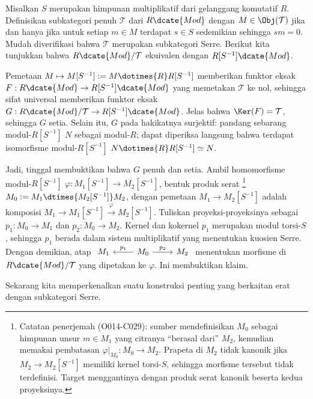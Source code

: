 \begin{contoh}
Misalkan $S$ merupakan himpunan multiplikatif dari gelanggang komutatif
$R$. Definisikan subkategori penuh $\mathcal{T}$ dari $R\dcate{Mod}$ dengan
$M\in\Obj(\mathcal{T})$ jika dan hanya jika untuk setiap $m\in M$ terdapat
$s\in S$ sedemikian sehingga $sm=0$. Mudah diverifikasi bahwa $\mathcal{T}$
merupakan subkategori Serre. Berikut kita tunjukkan bahwa
$R\dcate{Mod}/\mathcal{T}$ ekuivalen dengan $R[S^{-1}]\dcate{Mod}$.

Pemetaan $M\mapsto M[S^{-1}]:=M\dotimes{R}R[S^{-1}]$ memberikan funktor
eksak $F:R\dcate{Mod}\to R[S^{-1}]\dcate{Mod}$ yang memetakan
$\mathcal{T}$ ke nol, sehingga sifat universal memberikan funktor eksak
$G:R\dcate{Mod}/\mathcal{T}\to R[S^{-1}]\dcate{Mod}$. Jelas bahwa
$\Ker(F)=\mathcal{T}$, sehingga $G$ setia. Selain itu, $G$ pada hakikatnya
surjektif: pandang sebarang modul-$R[S^{-1}]$ $N$ sebagai modul-$R$; dapat
diperiksa langsung bahwa terdapat isomorfisme modul-$R[S^{-1}]$
$N\dotimes{R}R[S^{-1}]\simeq N$.

Jadi, tinggal membuktikan bahwa $G$ penuh dan setia. Ambil homomorfisme
modul-$R[S^{-1}]$
$\varphi:M_1[S^{-1}]\to M_2[S^{-1}]$, bentuk produk serat
\footnote{Catatan penerjemah (O014-C029): sumber mendefinisikan $M_0$ sebagai
himpunan unsur $m\in M_1$ yang citranya “berasal dari” $M_2$, kemudian
memakai pembatasan $\varphi|_{M_0}:M_0\to M_2$. Prapeta di $M_2$ tidak kanonik
jika $M_2\to M_2[S^{-1}]$ memiliki kernel torsi-$S$, sehingga morfisme tersebut
tidak terdefinisi. Target menggantinya dengan produk serat kanonik beserta
kedua proyeksinya.}
$M_0:=M_1\dtimes{M_2[S^{-1}]}M_2$, dengan pemetaan
$M_1\to M_2[S^{-1}]$ adalah komposisi
$M_1\to M_1[S^{-1}]\xrightarrow{\varphi}M_2[S^{-1}]$.
Tuliskan proyeksi-proyeksinya sebagai $p_1:M_0\to M_1$ dan
$p_2:M_0\to M_2$. Kernel dan kokernel $p_1$ merupakan modul torsi-$S$,
sehingga $p_1$ berada dalam sistem multiplikatif yang menentukan kuosien Serre.
Dengan demikian, atap
$\begin{tikzcd}
	M_1 & M_0 \arrow[l, "p_1"'] \arrow[r, "p_2"] & M_2
\end{tikzcd}$
menentukan morfisme di $R\dcate{Mod}/\mathcal{T}$ yang dipetakan ke $\varphi$.
Ini membuktikan klaim.
\end{contoh}

Sekarang kita memperkenalkan suatu konstruksi penting yang berkaitan erat
dengan subkategori Serre.

